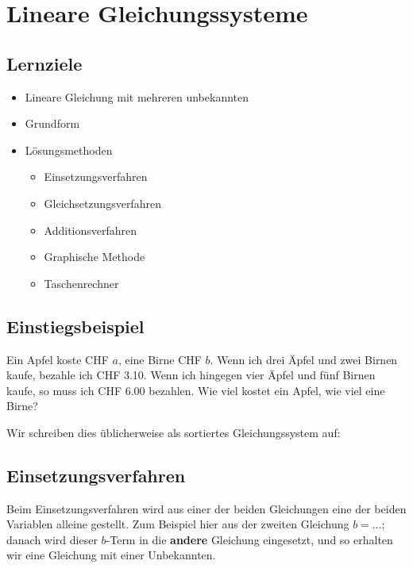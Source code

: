 \section{Lineare Gleichungssysteme}

\subsection*{Lernziele}
\begin{itemize}
	\item{Lineare Gleichung mit mehreren unbekannten}
	\item{Grundform}
	\item{Lösungsmethoden}
	\begin{itemize}
		\item{Einsetzungsverfahren}
		\item{Gleichsetzungsverfahren}
		\item{Additionsverfahren}
		\item{Graphische Methode}
		\item{Taschenrechner}
	\end{itemize}

\end{itemize}

\newpage
\subsection{Einstiegsbeispiel}
Ein Apfel koste CHF $a$, eine Birne CHF $b$. Wenn ich drei Äpfel und zwei Birnen kaufe, bezahle ich CHF 3.10. Wenn ich hingegen vier Äpfel und fünf Birnen kaufe, so muss ich CHF 6.00 bezahlen. Wie viel kostet ein Apfel, wie viel eine Birne?

Wir schreiben dies üblicherweise als sortiertes Gleichungssystem auf:



\subsection{Einsetzungsverfahren}\label{einsetzungsverfahren}
Beim Einsetzungsverfahren wird aus einer der beiden Gleichungen eine der beiden Variablen alleine gestellt. Zum Beispiel hier aus der zweiten Gleichung $b = ...$; danach wird dieser $b$-Term in die \textbf{andere} Gleichung eingesetzt, und so erhalten wir eine Gleichung mit einer Unbekannten.

